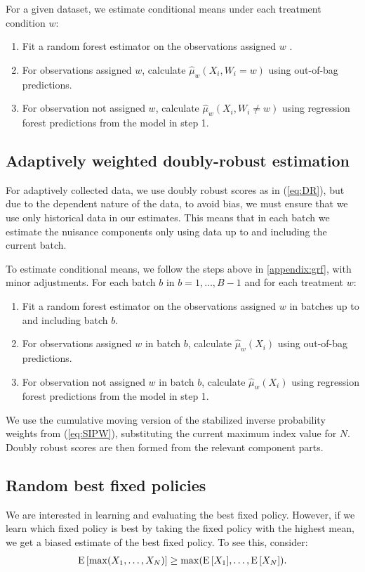 \documentclass[letterpaper, 12pt, parskip=full,]{scrartcl}
\begin{document}
For a given dataset, we estimate conditional means under each treatment condition $w$:
\begin{enumerate}
\item Fit a random forest estimator on the observations assigned $w$ . 
\item For observations assigned $w$, calculate $\hat\mu_w(X_i, W_i = w)$ using out-of-bag predictions. 
\item For observation not assigned $w$, calculate $\hat\mu_w(X_i, W_i \neq w)$ using regression forest predictions from the model in step 1. 
\end{enumerate}

\subsection{Adaptively weighted doubly-robust estimation} \label{appendix:DRlfo}
For adaptively collected data, we use doubly robust scores as in (\ref{eq:DR}), but due to the dependent nature of the data, to avoid bias, we must ensure that we use only historical data in our estimates. This means that in each batch we estimate the nuisance components only using data up to and including the current batch. 

To estimate conditional means, we follow the steps above in \ref{appendix:grf}, with minor adjustments. For each batch $b$ in $b = 1, \dots, B-1$ and for each treatment $w$:
\begin{enumerate}
\item Fit a random forest estimator on the observations assigned $w$ in batches up to and including batch $b$. 
\item For observations assigned $w$ in batch $b$, calculate $\hat\mu_w(X_i)$ using out-of-bag predictions. 
\item For observation not assigned $w$ in batch $b$, calculate $\hat\mu_w(X_i)$ using regression forest predictions from the model in step 1. 
\end{enumerate}

We use the cumulative moving version of the stabilized inverse probability weights from (\ref{eq:SIPW}), substituting the current maximum index value for $N$. 
Doubly robust scores are then formed from the relevant component parts. 


\subsection{Random best fixed policies}\label{appendix:bestfixed}
We are interested in learning and evaluating the best fixed policy. However, if we learn which fixed policy is best by taking the fixed policy with the highest mean, we get a biased estimate of the best fixed policy. To see this, consider:
\begin{align*}
{\textrm E}\,[\max(X_1, \dots, X_N)] \ge \max({\textrm E}\,[X_1],\dots, {\textrm E}\,[X_N]). 
\end{align*}
\end{document}
